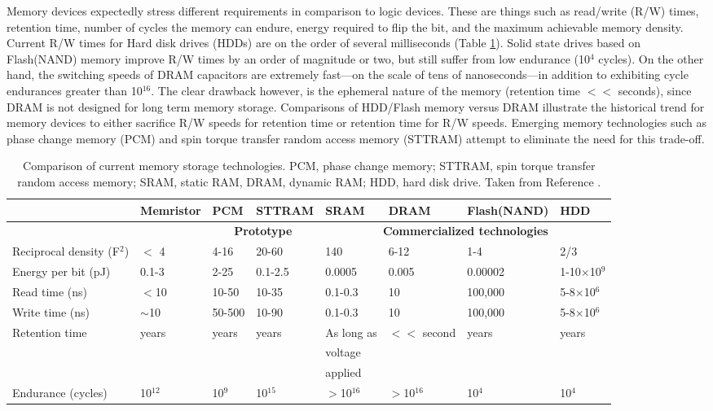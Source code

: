 Memory devices expectedly stress different requirements in comparison to logic devices. These are things such as read/write (R/W) times, retention time, number of cycles the memory can endure, energy required to flip the bit, and the maximum achievable memory density. Current R/W times for Hard disk drives (HDDs) are on the order of several milliseconds (Table \ref{table:memory}). Solid state drives based on Flash(NAND) memory improve R/W times by an order of magnitude or two, but still suffer from low endurance (10$^{4}$ cycles). On the other hand, the switching speeds of DRAM capacitors are extremely fast---on the scale of tens of nanoseconds---in addition to exhibiting cycle endurances greater than 10$^{16}$. The clear drawback however, is the ephemeral nature of the memory (retention time $<<$ seconds), since DRAM is not designed for long term memory storage. Comparisons of HDD/Flash memory versus DRAM illustrate the historical trend for memory devices to either sacrifice R/W speeds for retention time or retention time for R/W speeds. Emerging memory technologies such as phase change memory (PCM) and spin torque transfer random access memory (STTRAM) attempt to eliminate the need for this trade-off.

\begin{table}
\centering
\scriptsize
\begin{tabular}{llllllll}
\toprule
& \textbf{Memristor} & \textbf{PCM} & \textbf{STTRAM} & \textbf{SRAM} & \textbf{DRAM} & \textbf{Flash(NAND)} & \textbf{HDD}\\
\midrule
&&\multicolumn{2}{c}{\textbf{Prototype}}& \multicolumn{4}{c}{\textbf{Commercialized technologies}} \\
\cmidrule(lr){3-4} \cmidrule(lr){5-8} 
Reciprocal density (F$^{2}$)  & $<$ 4 & 4-16 & 20-60 & 140 & 6-12 & 1-4 & 2/3 \\
Energy per bit (pJ) & 0.1-3 & 2-25 & 0.1-2.5 & 0.0005 & 0.005 & 0.00002 & 1-10$\times$10$^{9}$  \\
Read time (ns) &  $<$10 & 10-50 & 10-35 & 0.1-0.3 & 10 & 100,000 & 5-8$\times$10$^{6}$\\
Write time (ns) & $\sim$10 & 50-500 & 10-90 & 0.1-0.3 & 10 & 100,000 & 5-8$\times$10$^{6}$ \\
Retention time & years & years & years & As long as & $<<$ second & years & years \\
&&&&voltage &&&\\
&&&&applied&&&\\
Endurance (cycles) &10$^{12}$&10$^{9}$&10$^{15}$&$>$10$^{16}$&$>$10$^{16}$&10$^{4}$&10$^{4}$\\
\bottomrule
\end{tabular}
\caption{Comparison of current memory storage technologies. PCM, phase change memory; STTRAM, spin torque transfer random access memory; SRAM, static RAM, DRAM, dynamic RAM; HDD, hard disk drive. Taken from Reference \cite{Yang2013}.}
\label{table:memory}
\end{table}

